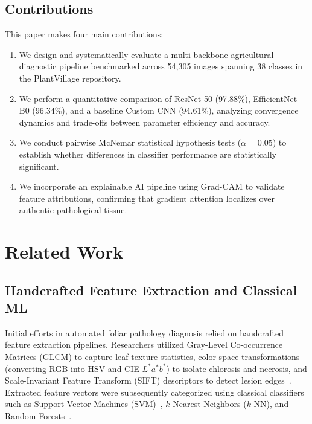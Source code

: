 \documentclass[journal]{IEEEtran}
\begin{document}
\subsection{Contributions}
This paper makes four main contributions:
\begin{enumerate}
    \item We design and systematically evaluate a multi-backbone agricultural diagnostic pipeline benchmarked across 54,305 images spanning 38 classes in the PlantVillage repository.
    \item We perform a quantitative comparison of ResNet-50 (97.88\%), EfficientNet-B0 (96.34\%), and a baseline Custom CNN (94.61\%), analyzing convergence dynamics and trade-offs between parameter efficiency and accuracy.
    \item We conduct pairwise McNemar statistical hypothesis tests ($\alpha = 0.05$) to establish whether differences in classifier performance are statistically significant.
    \item We incorporate an explainable AI pipeline using Grad-CAM to validate feature attributions, confirming that gradient attention localizes over authentic pathological tissue.
\end{enumerate}

\section{Related Work}

\subsection{Handcrafted Feature Extraction and Classical ML}
Initial efforts in automated foliar pathology diagnosis relied on handcrafted feature extraction pipelines. Researchers utilized Gray-Level Co-occurrence Matrices (GLCM) to capture leaf texture statistics, color space transformations (converting RGB into HSV and CIE $L^*a^*b^*$) to isolate chlorosis and necrosis, and Scale-Invariant Feature Transform (SIFT) descriptors to detect lesion edges~\cite{camargo2009, revathi2012}. Extracted feature vectors were subsequently categorized using classical classifiers such as Support Vector Machines (SVM)~\cite{cortes1995}, $k$-Nearest Neighbors ($k$-NN), and Random Forests~\cite{breiman2001}. 
\end{document}
